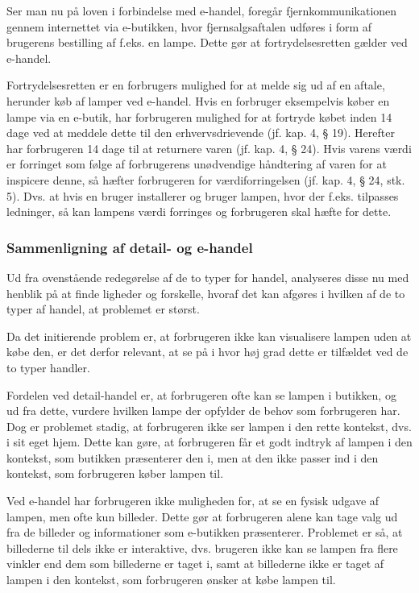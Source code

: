Ser man nu på loven i forbindelse med e-handel, foregår fjernkommunikationen gennem internettet via e-butikken, hvor fjernsalgsaftalen udføres i form af brugerens bestilling af f.eks. en lampe. Dette gør at fortrydelsesretten gælder ved e-handel.

Fortrydelsesretten er en forbrugers mulighed for at melde sig ud af en aftale, herunder køb af lamper ved e-handel. Hvis en forbruger eksempelvis køber en lampe via en e-butik, har forbrugeren mulighed for at fortryde købet inden 14 dage ved at meddele dette til den erhvervsdrievende (jf. kap. 4, § 19). Herefter har forbrugeren 14 dage til at returnere varen (jf. kap. 4, § 24). Hvis varens værdi er forringet som følge af forbrugerens unødvendige håndtering af varen for at inspicere denne, så hæfter forbrugeren for værdiforringelsen (jf. kap. 4, § 24, stk. 5). Dvs. at hvis en bruger installerer og bruger lampen, hvor der f.eks. tilpasses ledninger, så kan lampens værdi forringes og forbrugeren skal hæfte for dette. 

\subsubsection{Sammenligning af detail- og e-handel}
Ud fra ovenstående redegørelse af de to typer for handel, analyseres disse nu med henblik på at finde ligheder og forskelle, hvoraf det kan afgøres i hvilken af de to typer af handel, at problemet er størst. 

Da det initierende problem er, at forbrugeren ikke kan visualisere lampen uden at købe den, er det derfor relevant, at se på i hvor høj grad dette er tilfældet ved de to typer handler.

Fordelen ved detail-handel er, at forbrugeren ofte kan se lampen i butikken, og ud fra dette, vurdere hvilken lampe der opfylder de behov som forbrugeren har. Dog er problemet stadig, at forbrugeren ikke ser lampen i den rette kontekst, dvs. i sit eget hjem. Dette kan gøre, at forbrugeren får et godt indtryk af lampen i den kontekst, som butikken præsenterer den i, men at den ikke passer ind i den kontekst, som forbrugeren køber lampen til.

Ved e-handel har forbrugeren ikke muligheden for, at se en fysisk udgave af lampen, men ofte kun billeder. Dette gør at forbrugeren alene kan tage valg ud fra de billeder og informationer som e-butikken præsenterer. Problemet er så, at billederne til dels ikke er interaktive, dvs. brugeren ikke kan se lampen fra flere vinkler end dem som billederne er taget i, samt at billederne ikke er taget af lampen i den kontekst, som forbrugeren ønsker at købe lampen til. 

